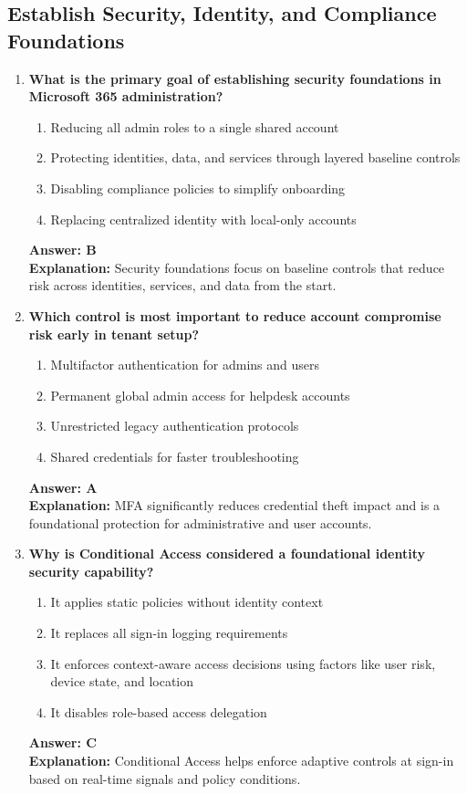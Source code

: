 \documentclass[10pt]{article}
\begin{document}
\subsection{Establish Security, Identity, and Compliance Foundations}
\begin{enumerate}[leftmargin=*]

\item \textbf{What is the primary goal of establishing security foundations in Microsoft 365 administration?}
\begin{enumerate}[label=\Alph*.]
  \item Reducing all admin roles to a single shared account
  \item Protecting identities, data, and services through layered baseline controls
  \item Disabling compliance policies to simplify onboarding
  \item Replacing centralized identity with local-only accounts
\end{enumerate}
\textbf{Answer: B}\\
\textbf{Explanation:} Security foundations focus on baseline controls that reduce risk across identities, services, and data from the start.

\item \textbf{Which control is most important to reduce account compromise risk early in tenant setup?}
\begin{enumerate}[label=\Alph*.]
  \item Multifactor authentication for admins and users
  \item Permanent global admin access for helpdesk accounts
  \item Unrestricted legacy authentication protocols
  \item Shared credentials for faster troubleshooting
\end{enumerate}
\textbf{Answer: A}\\
\textbf{Explanation:} MFA significantly reduces credential theft impact and is a foundational protection for administrative and user accounts.

\item \textbf{Why is Conditional Access considered a foundational identity security capability?}
\begin{enumerate}[label=\Alph*.]
  \item It applies static policies without identity context
  \item It replaces all sign-in logging requirements
  \item It enforces context-aware access decisions using factors like user risk, device state, and location
  \item It disables role-based access delegation
\end{enumerate}
\textbf{Answer: C}\\
\textbf{Explanation:} Conditional Access helps enforce adaptive controls at sign-in based on real-time signals and policy conditions.


\end{enumerate}
\end{document}
